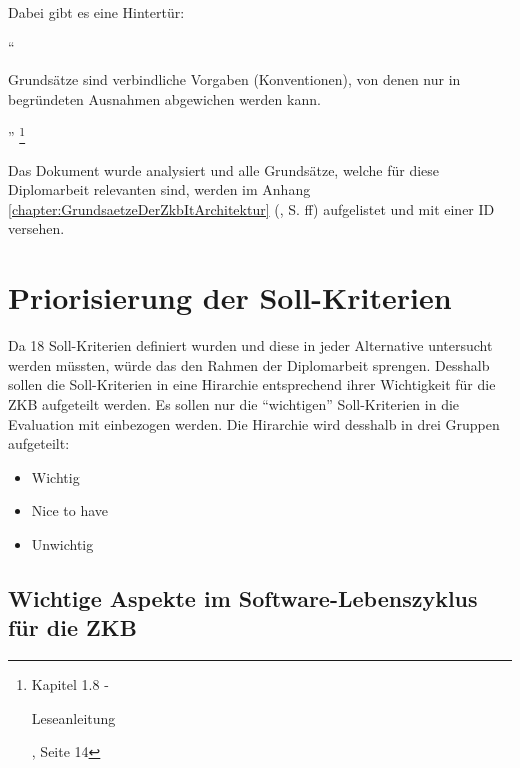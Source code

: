   \noindent
  Dabei gibt es eine Hintertür:
  \newline

  ``\begin{itshape}Grundsätze sind verbindliche Vorgaben (Konventionen), von
  denen nur in begründeten Ausnahmen abgewichen werden kann.\end{itshape}''
  \footnote{\cite{ZkbHandbuchDerItArchitektur} Kapitel 1.8 -
  \begin{itshape}Leseanleitung\end{itshape}, Seite 14}
  \newline
  
  \noindent
  Das Dokument wurde analysiert und alle Grundsätze, welche für diese
  Diplomarbeit relevanten sind, werden im Anhang
  \ref{chapter:GrundsaetzeDerZkbItArchitektur}
  (, S.
  \pageref{chapter:GrundsaetzeDerZkbItArchitektur}ff) aufgelistet und mit einer
  ID versehen.

  \section{Priorisierung der Soll-Kriterien}
  
  Da 18 Soll-Kriterien definiert wurden und diese in jeder Alternative 
  untersucht werden müssten, würde das den Rahmen der Diplomarbeit sprengen.
  Desshalb sollen die Soll-Kriterien in eine Hirarchie entsprechend ihrer
  Wichtigkeit für die \ac{ZKB} aufgeteilt werden. Es sollen nur die
  ``wichtigen'' Soll-Kriterien in die Evaluation mit einbezogen werden. Die
  Hirarchie wird desshalb in drei Gruppen aufgeteilt:
  
  \begin{itemize}
    \item Wichtig
    \item Nice to have
    \item Unwichtig
  \end{itemize}
  
  \noindent

  
  \subsection{Wichtige Aspekte im Software-Lebenszyklus für die ZKB}
  
